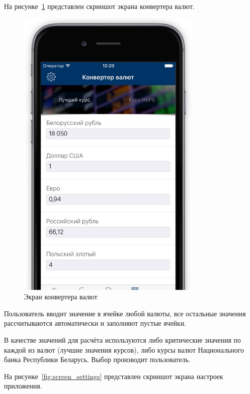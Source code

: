 \pagebreak
На рисунке~\ref{fig:screen_converter} представлен скриншот
экрана конвертера валют.

\begin{figure}[h!]
  \centering
  \includegraphics[width=90mm]{pic/screen_converter}
  \caption{Экран конвертера валют}
  \label{fig:screen_converter}
\end{figure}

Пользователь вводит значение в ячейке любой валюты, все
остальные значения рассчитываются автоматически и заполняют
пустые ячейки.

В качестве значений для расчёта используются либо критические
значения по каждой из валют (лучшие значения курсов), либо
курсы валют Национального банка Республики Беларусь. Выбор
производит пользователь.


\pagebreak
На рисунке~\ref{fig:screen_settings} представлен скриншот экрана
настроек приложения.

